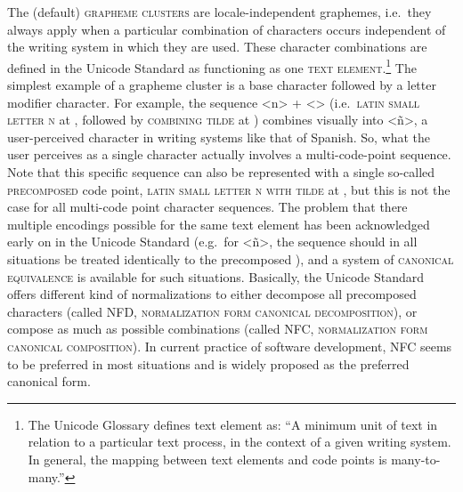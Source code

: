 The (default) \textsc{grapheme clusters} are locale-independent graphemes,
i.e.~they always apply when a particular combination of characters occurs
independent of the writing system in which they are used. These character
combinations are defined in the Unicode Standard as functioning as one
\textsc{text element}.\footnote{The Unicode Glossary defines text element as:
``A minimum unit of text in relation to a particular text process, in the
context of a given writing system. In general, the mapping between text elements
and code points is many-to-many.''} The simplest example of a grapheme cluster
is a base character followed by a letter modifier character. For example, the
sequence <n> + <> (i.e.~\textsc{latin small letter n} at , followed
by \textsc{combining tilde} at ) combines visually into <ñ>, a
user-perceived character in writing systems like that of Spanish. So, what the
user perceives as a single character actually involves a multi-code-point
sequence. Note that this specific sequence can also be represented with a single
so-called \textsc{precomposed} code point, \textsc{latin small letter n with
tilde} at , but this is not the case for all multi-code point
character sequences. The problem that there multiple encodings possible for the
same text element has been acknowledged early on in the Unicode Standard
(e.g.~for <ñ>, the sequence   should in all situations be
treated identically to the precomposed ), and a system of
\textsc{canonical equivalence} is available for such situations. Basically, the
Unicode Standard offers different kind of normalizations to either decompose all
precomposed characters (called \textsc{NFD}, \textsc{normalization form
canonical decomposition}), or compose as much as possible combinations (called
\textsc{NFC}, \textsc{normalization form canonical composition}). In current
practice of software development, NFC seems to be preferred in most situations
and is widely proposed as the preferred canonical form.

